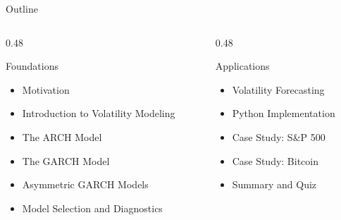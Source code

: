 \documentclass[9pt, aspectratio=169, t]{beamer}
\begin{document}
\begin{frame}{Outline}
    \vspace{-0.3cm}
    {\small
    \begin{columns}[T]
        \begin{column}{0.48\textwidth}
            \begin{block}{Foundations}
                \begin{itemize}\setlength{\itemsep}{3pt}
                    \item Motivation
                    \item Introduction to Volatility Modeling
                    \item The ARCH Model
                    \item The GARCH Model
                    \item Asymmetric GARCH Models
                    \item Model Selection and Diagnostics
                \end{itemize}
            \end{block}
        \end{column}
        \begin{column}{0.48\textwidth}
            \begin{exampleblock}{Applications}
                \begin{itemize}\setlength{\itemsep}{3pt}
                    \item Volatility Forecasting
                    \item Python Implementation
                    \item Case Study: S\&P 500
                    \item Case Study: Bitcoin
                    \item Summary and Quiz
                \end{itemize}
            \end{exampleblock}
        \end{column}
    \end{columns}
    }
\end{frame}

\end{document}
